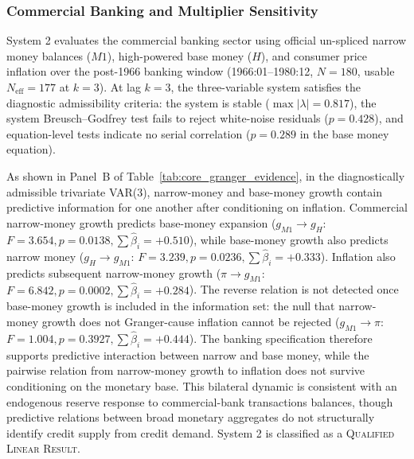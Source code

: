 \subsubsection{Commercial Banking and Multiplier Sensitivity}
\label{sec:granger_banking}

System 2 evaluates the commercial banking sector using official un-spliced narrow money balances ($M1$), high-powered base money ($H$), and consumer price inflation over the post-1966 banking window (1966:01--1980:12, $N=180$, usable $N_{\text{eff}}=177$ at $k=3$). At lag $k=3$, the three-variable system satisfies the diagnostic admissibility criteria: the system is stable ($\max |\lambda| = 0.817$), the system Breusch--Godfrey test fails to reject white-noise residuals ($p = 0.428$), and equation-level tests indicate no serial correlation ($p = 0.289$ in the base money equation).

As shown in Panel~B of Table~\ref{tab:core_granger_evidence}, in the diagnostically admissible trivariate VAR(3), narrow-money and base-money growth contain predictive information for one another after conditioning on inflation. Commercial narrow-money growth predicts base-money expansion ($g_{M1} \to g_H$: $F = 3.654, p = 0.0138, \sum \hat{\beta}_i = +0.510$), while base-money growth also predicts narrow money ($g_H \to g_{M1}$: $F = 3.239, p = 0.0236, \sum \hat{\beta}_i = +0.333$). Inflation also predicts subsequent narrow-money growth ($\pi \to g_{M1}$: $F = 6.842, p = 0.0002, \sum \hat{\beta}_i = +0.284$). The reverse relation is not detected once base-money growth is included in the information set: the null that narrow-money growth does not Granger-cause inflation cannot be rejected ($g_{M1} \to \pi$: $F = 1.004, p = 0.3927, \sum \hat{\beta}_i = +0.444$). The banking specification therefore supports predictive interaction between narrow and base money, while the pairwise relation from narrow-money growth to inflation does not survive conditioning on the monetary base. This bilateral dynamic is consistent with an endogenous reserve response to commercial-bank transactions balances, though predictive relations between broad monetary aggregates do not structurally identify credit supply from credit demand. System 2 is classified as a \textsc{Qualified Linear Result}.

